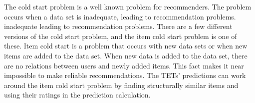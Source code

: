 The cold start problem is a well known problem for recommenders\cite{Ricci2015}\cite{saveski2014item}.
The problem occurs when a data set is 
inadequate, leading to recommendation problems.
inadequate leading to recommendation problems.
There are a few different versions of the cold start problem, and the item cold start problem is one of these. 
Item cold start is a problem that occurs with new data sets or when new items are added to the data set.
When new data is added to the data set, there are no relations between users and newly added items.
This fact makes it near impossible to make reliable recommendations.
The TETs' predictions can work around the item cold start problem by finding structurally similar items and using their ratings in the prediction calculation.
